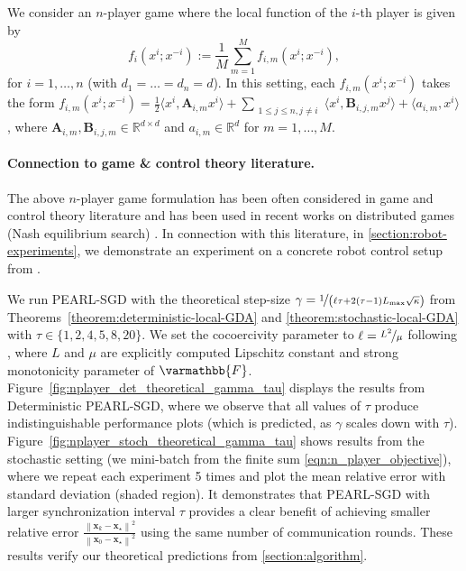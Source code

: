 \documentclass{article}
\newcommand{\algname}[1]{{\color{PineGreen}\sf  #1}\xspace}
\newcommand{\vx}{{\mathbf{x}}}
\newcommand{\opF}{{\varmathbb{F}}}
\newcommand{\sqnorm}[1]{\left\| #1 \right\|^2}
\newcommand{\abbvname}{\algname{PEARL-SGD}}
\theoremstyle{plain}
\theoremstyle{remark}
\begin{document}
We consider an $n$-player game where the local function of the $i$-th player is given by
\begin{equation}\label{eqn:n_player_objective}
\textstyle
    f_i (x^i; x^{-i}) := \frac{1}{M} \sum_{m=1}^M f_{i,m} (x^i; x^{-i}),
\end{equation}
for $i=1,\dots,n$ (with $d_1 = \dots = d_n = d$). 
In this setting, each $f_{i,m} (x^i; x^{-i})$ takes the form $f_{i,m} (x^i; x^{-i}) = \frac{1}{2} \langle x^i, \mathbf{A}_{i,m} x^i \rangle + \sum_{\substack{1 \leq j \leq n, j \neq i}} \langle x^i, \mathbf{B}_{i,j,m} x^j \rangle + \langle a_{i,m}, x^i \rangle$,
where $\mathbf{A}_{i,m}, \mathbf{B}_{i,j,m} \in \mathbb{R}^{d \times d}$ and $a_{i,m} \in \mathbb{R}^d$ for $m = 1, \dots, M$. 

\paragraph{Connection to game \& control theory literature.}
The above $n$-player game formulation has been often considered in game and control theory literature and has been used in recent works on distributed games (Nash equilibrium search) \citep{SalehisadaghianiPavel2016_distributed, YeHu2017_distributed, LiDing2019_distributed, TatarenkoShiNedic2021_geometric, KalyvaPsillakis2024_distributed}.
In connection with this literature, in \cref{section:robot-experiments}, we demonstrate an experiment on a concrete robot control setup from \citep{KalyvaPsillakis2024_distributed}.

We run \abbvname with the theoretical step-size $\gamma = \nicefrac{1}{\left(\ell\tau + 2(\tau - 1) L_{\mathrm{max}} \sqrt{\kappa} \right)}$ from Theorems~\ref{theorem:deterministic-local-GDA} and \ref{theorem:stochastic-local-GDA} with $\tau \in \{1, 2, 4, 5, 8, 20\}$.
We set the cocoercivity parameter to $\ell = \nicefrac{L^2}{\mu}$ following \citep{Facchinei2003FiniteDimensionalVI}, where $L$ and $\mu$ are explicitly computed Lipschitz constant and strong monotonicity parameter of $\opF$.
Figure~\ref{fig:nplayer_det_theoretical_gamma_tau} displays the results from Deterministic \abbvname, where we observe that all values of $\tau$ produce indistinguishable performance plots (which is predicted, as $\gamma$ scales down with $\tau$). 
Figure~\ref{fig:nplayer_stoch_theoretical_gamma_tau} shows results from the stochastic setting (we mini-batch from the finite sum \eqref{eqn:n_player_objective}), where we repeat each experiment 5 times and plot the mean relative error with standard deviation (shaded region).
It demonstrates that \abbvname with larger synchronization interval $\tau$ provides a clear benefit of achieving smaller relative error $\frac{\sqnorm{\vx_k - \vx_\star}}{\sqnorm{\vx_0 - \vx_\star}}$ using the same number of communication rounds.
These results verify our theoretical predictions from \cref{section:algorithm}.
\end{document}
